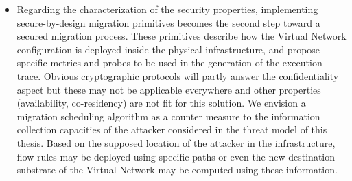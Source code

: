 \begin{itemize}
    \item 
    Regarding the characterization of the security properties, implementing secure-by-design migration primitives becomes the second step toward a secured migration process. These primitives describe how the Virtual Network configuration is deployed inside the physical infrastructure, and propose specific metrics and probes to be used in the generation of the execution trace. Obvious cryptographic protocols will partly answer the confidentiality aspect but these may not be applicable everywhere and other properties (\eg availability, co-residency) are not fit for this solution. We envision a migration scheduling algorithm as a counter measure to the information collection capacities of the attacker considered in the threat model of this thesis. Based on the supposed location of the attacker in the infrastructure, flow rules may be deployed using specific paths or even the new destination substrate of the Virtual Network may be computed using these information. 
    
\end{itemize}

